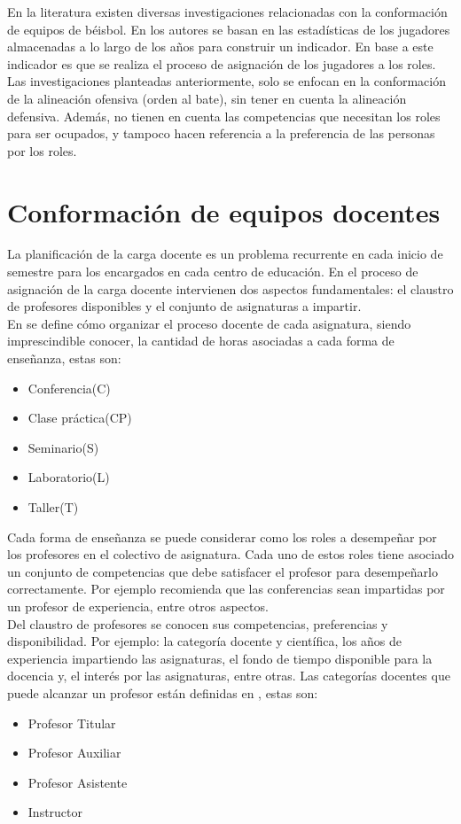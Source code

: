 En la literatura existen diversas investigaciones relacionadas con la conformación de equipos de béisbol. En \cite{Polyashuk2015, Sugrue2007} los autores se basan en las estadísticas de los jugadores almacenadas a lo largo de los años para construir un indicador. En base a este indicador es que se realiza el proceso de asignación de los jugadores a los roles. Las investigaciones planteadas anteriormente, solo se enfocan en la conformación de la alineación ofensiva (orden al bate), sin tener en cuenta la alineación defensiva. Además, no tienen en cuenta las competencias que necesitan los roles para ser ocupados, y tampoco hacen referencia a la preferencia de las personas por los roles.

\section{Conformación de equipos docentes} \label{ej-carga}

La planificación de la carga docente es un problema recurrente en cada inicio de semestre para los encargados en cada centro de educación. En el proceso de asignación de la carga docente intervienen dos aspectos fundamentales: el claustro de profesores disponibles y el conjunto de asignaturas a impartir.\\

En \cite{res2018} se define cómo organizar el proceso docente de cada asignatura, siendo imprescindible conocer, la cantidad de horas asociadas a cada forma de enseñanza, estas son:
\begin{itemize}
	\item Conferencia(C)
	\item Clase práctica(CP)
	\item Seminario(S)
	\item Laboratorio(L)
	\item Taller(T)
\end{itemize}

Cada forma de enseñanza se puede considerar como los roles a desempeñar por los profesores en el colectivo de asignatura. Cada uno de estos roles tiene asociado un conjunto de competencias que debe satisfacer el profesor para desempeñarlo correctamente. Por ejemplo \cite{res2016} recomienda que las conferencias sean impartidas por un profesor de experiencia, entre otros aspectos.\\

Del claustro de profesores se conocen sus competencias, preferencias y disponibilidad. Por ejemplo: la categoría docente y científica, los años de experiencia impartiendo las asignaturas, el fondo de tiempo disponible para la docencia y, el interés por las asignaturas, entre otras. Las categorías docentes que puede alcanzar un profesor están definidas en \cite{res2016}, estas son:
\begin{itemize}
	\item Profesor Titular
	\item Profesor Auxiliar
	\item Profesor Asistente
	\item Instructor
\end{itemize} 

